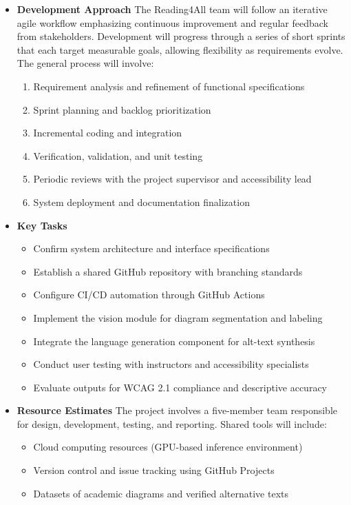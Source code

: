 \documentclass[12pt]{article}
\begin{document}
\begin{itemize}
  \item \textbf{Development Approach}
    The Reading4All team will follow an iterative agile workflow
    emphasizing continuous improvement and regular feedback from
    stakeholders. Development will progress through a series of short
    sprints that each target measurable goals, allowing flexibility
    as requirements evolve. The general process will involve:
    \begin{enumerate}
      \item Requirement analysis and refinement of functional specifications
      \item Sprint planning and backlog prioritization
      \item Incremental coding and integration
      \item Verification, validation, and unit testing
      \item Periodic reviews with the project supervisor and accessibility lead
      \item System deployment and documentation finalization
    \end{enumerate}

  \item \textbf{Key Tasks}
    \begin{itemize}
      \item Confirm system architecture and interface specifications
      \item Establish a shared GitHub repository with branching standards
      \item Configure CI/CD automation through GitHub Actions
      \item Implement the vision module for diagram segmentation and labeling
      \item Integrate the language generation component for alt-text synthesis
      \item Conduct user testing with instructors and accessibility specialists
      \item Evaluate outputs for WCAG 2.1 compliance and descriptive accuracy
    \end{itemize}

  \item \textbf{Resource Estimates}
    The project involves a five-member team responsible for design,
    development, testing, and reporting. Shared tools will include:
    \begin{itemize}
      \item Cloud computing resources (GPU-based inference environment)
      \item Version control and issue tracking using GitHub Projects
      \item Datasets of academic diagrams and verified alternative texts
    \end{itemize}


\end{itemize}
\end{document}
